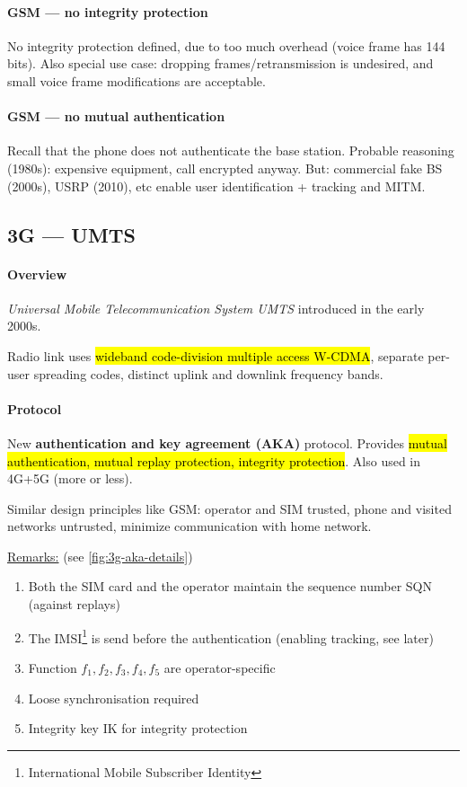 \paragraph{GSM --- no integrity protection}
No integrity protection defined, due to too much overhead (voice frame has 144
bits). Also special use case: dropping frames/retransmission is undesired, and
small voice frame modifications are acceptable.

\paragraph{GSM --- no mutual authentication}
Recall that the phone does not authenticate the base station. Probable
reasoning (1980s): expensive equipment, call encrypted anyway. But: commercial
fake BS (2000s), USRP (2010), etc enable user identification + tracking and
MITM.

\subsection{3G --- UMTS}

\paragraph{Overview}
\textit{Universal Mobile Telecommunication System UMTS} introduced in the early 2000s.

Radio link uses \hl{wideband code-division multiple access W-CDMA},
separate per-user spreading codes, distinct uplink and downlink frequency
bands.

\paragraph{Protocol}
New \textbf{authentication and key agreement (AKA)} protocol. Provides \hl{mutual
	authentication, mutual replay protection, integrity protection}. Also used in
4G+5G (more or less).

Similar design principles like GSM: operator and SIM trusted, phone and visited
networks untrusted, minimize communication with home network.

\underline{Remarks:} (see \autoref{fig:3g-aka-details})
\begin{enumerate}
	\item Both the SIM card and the operator maintain the sequence number SQN (against
	      replays)
	\item The IMSI\footnote{International Mobile Subscriber Identity} is send before the
	      authentication (enabling tracking, see later)
	\item Function $f_1, f_2, f_3, f_4, f_5$ are operator-specific
	\item Loose synchronisation required
	\item Integrity key IK for integrity protection
\end{enumerate}

